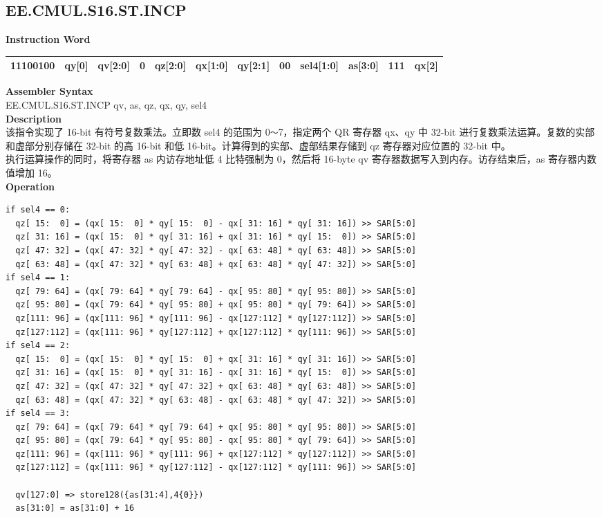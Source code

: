 \clearpage
\subsection{EE.CMUL.S16.ST.INCP}\label{instruction:EECMULS16STINCP}
\setlength\tabcolsep{6pt}
\textbf{Instruction Word} \\
\begin{tabular}{|c|c|c|c|c|c|c|c|c|c|c|c|}
	\hline
	11100100 & qy[0] & qv[2:0] & 0 & qz[2:0] & qx[1:0] & qy[2:1] & 00 & sel4[1:0] & as[3:0] & 111 & qx[2] \\
	\hline
\end{tabular}

\textbf{Assembler Syntax} \\
EE.CMUL.S16.ST.INCP qv, as, qz, qx, qy, sel4 \\
\textbf{Description} \\
该指令实现了 16-bit 有符号复数乘法。立即数 sel4 的范围为 0\verb+～+7，指定两个 QR 寄存器 qx、qy 中 32-bit 进行复数乘法运算。复数的实部和虚部分别存储在 32-bit 的高 16-bit 和低 16-bit。计算得到的实部、虚部结果存储到 qz 寄存器对应位置的 32-bit 中。\\ 执行运算操作的同时，将寄存器 as 内访存地址低 4 比特强制为 0，然后将 16-byte qv 寄存器数据写入到内存。访存结束后，as 寄存器内数值增加 16。\\
\textbf{Operation}
\begin{lstlisting}
if sel4 == 0:
  qz[ 15:  0] = (qx[ 15:  0] * qy[ 15:  0] - qx[ 31: 16] * qy[ 31: 16]) >> SAR[5:0]
  qz[ 31: 16] = (qx[ 15:  0] * qy[ 31: 16] + qx[ 31: 16] * qy[ 15:  0]) >> SAR[5:0]
  qz[ 47: 32] = (qx[ 47: 32] * qy[ 47: 32] - qx[ 63: 48] * qy[ 63: 48]) >> SAR[5:0]
  qz[ 63: 48] = (qx[ 47: 32] * qy[ 63: 48] + qx[ 63: 48] * qy[ 47: 32]) >> SAR[5:0]
if sel4 == 1:
  qz[ 79: 64] = (qx[ 79: 64] * qy[ 79: 64] - qx[ 95: 80] * qy[ 95: 80]) >> SAR[5:0]
  qz[ 95: 80] = (qx[ 79: 64] * qy[ 95: 80] + qx[ 95: 80] * qy[ 79: 64]) >> SAR[5:0]
  qz[111: 96] = (qx[111: 96] * qy[111: 96] - qx[127:112] * qy[127:112]) >> SAR[5:0]
  qz[127:112] = (qx[111: 96] * qy[127:112] + qx[127:112] * qy[111: 96]) >> SAR[5:0]
if sel4 == 2:
  qz[ 15:  0] = (qx[ 15:  0] * qy[ 15:  0] + qx[ 31: 16] * qy[ 31: 16]) >> SAR[5:0]
  qz[ 31: 16] = (qx[ 15:  0] * qy[ 31: 16] - qx[ 31: 16] * qy[ 15:  0]) >> SAR[5:0]
  qz[ 47: 32] = (qx[ 47: 32] * qy[ 47: 32] + qx[ 63: 48] * qy[ 63: 48]) >> SAR[5:0]
  qz[ 63: 48] = (qx[ 47: 32] * qy[ 63: 48] - qx[ 63: 48] * qy[ 47: 32]) >> SAR[5:0]
if sel4 == 3:
  qz[ 79: 64] = (qx[ 79: 64] * qy[ 79: 64] + qx[ 95: 80] * qy[ 95: 80]) >> SAR[5:0]
  qz[ 95: 80] = (qx[ 79: 64] * qy[ 95: 80] - qx[ 95: 80] * qy[ 79: 64]) >> SAR[5:0]
  qz[111: 96] = (qx[111: 96] * qy[111: 96] + qx[127:112] * qy[127:112]) >> SAR[5:0]
  qz[127:112] = (qx[111: 96] * qy[127:112] - qx[127:112] * qy[111: 96]) >> SAR[5:0]

  qv[127:0] => store128({as[31:4],4{0}})
  as[31:0] = as[31:0] + 16
\end{lstlisting}

